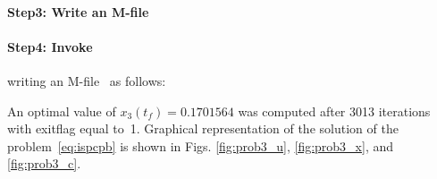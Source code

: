 {\small }

\paragraph{Step3: Write an M-file~}

{\small }

\paragraph{Step4: Invoke~} writing an
M-file~ as follows: 

{\small }

An optimal value of $x_{3}(t_{f})=0.1701564$ was computed after 3013
iterations with exitflag equal to~1. Graphical representation of the
solution of the problem~\eqref{eq:ispcpb} is shown in
Figs. \ref{fig:prob3_u}, \ref{fig:prob3_x}, and \ref{fig:prob3_c}.

